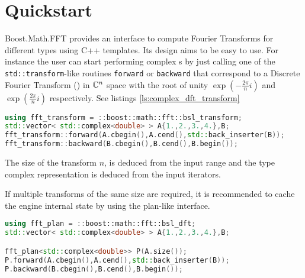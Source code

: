 \section{Quickstart}

Boost.Math.FFT provides an interface to compute Fourier Transforms for different
types using C++ templates.
Its design aims to be easy to use.
For instance the user can start performing 
complex \fft s by just calling one of the \texttt{std::transform}-like routines
\texttt{forward} or \texttt{backward} that correspond to a Discrete Fourier
Transform (\dft) in $\mathbb{C}^n$ space with the root of unity
$\exp(-\frac{2\pi}{n} i)$ and $\exp(\frac{2\pi}{n} i)$ respectively.
See listings \ref{ls:complex_dft_transform}
\begin{lstlisting}[language=C++,label=ls:complex_dft_transform,caption=Simple complex FFT
transform.]
using fft_transform = ::boost::math::fft::bsl_transform;
std::vector< std::complex<double> > A{1.,2.,3.,4.},B;
fft_transform::forward(A.cbegin(),A.cend(),std::back_inserter(B));
fft_transform::backward(B.cbegin(),B.cend(),B.begin());
\end{lstlisting}
The size of the transform $n$, is deduced from the input range and the type
complex representation is deduced from the input iterators.

If multiple transforms of the same size are required, it is recommended to cache
the engine internal state by using the plan-like interface.
\begin{lstlisting}[language=C++,label=ls:complex_dft_plan,caption=Simple complex FFT
Plan.]
using fft_plan = ::boost::math::fft::bsl_dft;
std::vector< std::complex<double> > A{1.,2.,3.,4.},B;

fft_plan<std::complex<double>> P(A.size());
P.forward(A.cbegin(),A.cend(),std::back_inserter(B));
P.backward(B.cbegin(),B.cend(),B.begin());
\end{lstlisting}
